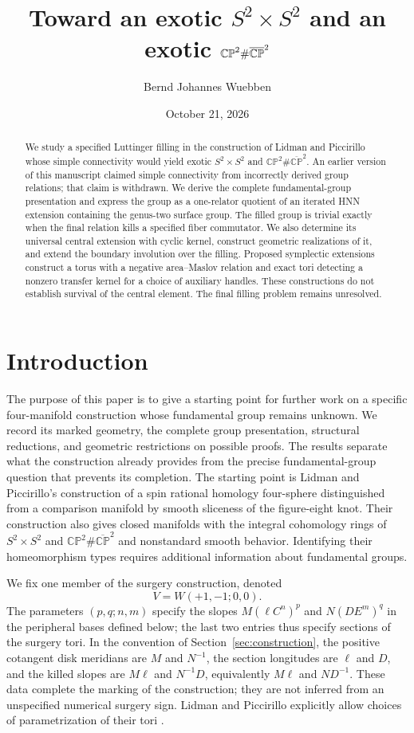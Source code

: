\documentclass[11pt]{amsart}
\title[Toward an exotic $S^2\times S^2$]{Toward an exotic $S^2\times S^2$
 and an exotic $\CP^2\#\bCP^2$}
\author{Bernd Johannes Wuebben}
\date{October 21, 2026}
\theoremstyle{definition}
\theoremstyle{remark}
\newcommand{\CP}{\mathbb{CP}}
\newcommand{\bCP}{\overline{\mathbb{CP}}}
\begin{document}
\raggedbottom
\begin{abstract}
We study a specified Luttinger filling in the construction of Lidman
and Piccirillo whose simple connectivity would yield exotic
$S^2\times S^2$ and $\CP^2\#\bCP^2$. An earlier version of this
manuscript claimed simple connectivity from incorrectly derived group
relations; that claim is withdrawn. We derive the complete
fundamental-group presentation and express the group as a one-relator
quotient of an iterated HNN extension containing the genus-two surface
group. The filled group is trivial exactly when the final relation
kills a specified fiber commutator. We also determine its universal
central extension with cyclic kernel, construct geometric realizations
of it, and extend the boundary involution over the filling. Proposed
symplectic extensions construct a torus with a negative area--Maslov
relation and exact tori detecting a nonzero transfer kernel for a
choice of auxiliary handles. These constructions do not establish
survival of the central element.
The final filling problem remains unresolved.
\end{abstract}
\maketitle
\clearpage
\setcounter{tocdepth}{2}
\tableofcontents
\clearpage

\section{Introduction}

The purpose of this paper is to give a starting point for further work
on a specific four-manifold construction whose fundamental group remains
unknown. We record its marked geometry, the complete group presentation,
structural reductions, and geometric restrictions on possible proofs.
The results separate what the construction already provides from the
precise fundamental-group question that prevents its completion.
The starting point is Lidman and Piccirillo's construction
\cite{LP25} of a spin rational homology four-sphere distinguished from
a comparison manifold by smooth sliceness of the figure-eight knot.
Their construction also gives closed manifolds with the integral
cohomology rings of $S^2\times S^2$ and $\CP^2\#\bCP^2$ and
nonstandard smooth behavior. Identifying their homeomorphism types
requires additional information about fundamental groups.

We fix one member of the surgery construction, denoted
\[
                  V=W(+1,-1;0,0).
\]
The parameters $(p,q;n,m)$ specify the slopes
$M(\ell C^n)^p$ and $N(DE^m)^q$ in the peripheral bases defined below;
the last two entries thus specify sections of the surgery tori.
In the convention of
Section~\ref{sec:construction}, the positive cotangent disk meridians are
$M$ and $N^{-1}$, the section longitudes are $\ell$ and $D$, and the
killed slopes are $M\ell$ and $N^{-1}D$, equivalently $M\ell$ and
$ND^{-1}$. These data complete the marking of the construction;
they are not inferred from an unspecified numerical surgery sign.
Lidman and Piccirillo explicitly allow choices of parametrization of
their tori \cite[Section 1, footnote 2]{LP25}.
\end{document}
